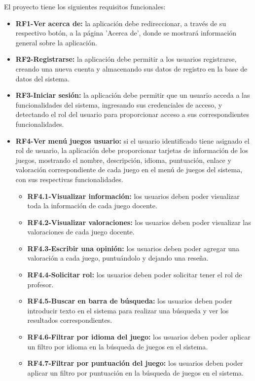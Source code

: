 El proyecto tiene los siguientes requisitos funcionales:
\begin{itemize}
\tightlist
    \item \textbf{RF1-Ver acerca de:} la aplicación debe redireccionar, a través de su respectivo botón, a la página 'Acerca de', donde se mostrará información general sobre la aplicación.
    \item \textbf{RF2-Registrarse:} la aplicación debe permitir a los usuarios registrarse, creando una nueva cuenta y almacenando sus datos de registro en la base de datos del sistema.
    \item \textbf{RF3-Iniciar sesión:} la aplicación debe permitir que un usuario acceda a las funcionalidades del sistema, ingresando sus credenciales de acceso, y detectando el rol del usuario para proporcionar acceso a sus correspondientes funcionalidades.
    \item \textbf{RF4-Ver menú juegos usuario:} si el usuario identificado tiene asignado el rol de usuario, la aplicación debe proporcionar tarjetas de información de los juegos, mostrando el nombre, descripción, idioma, puntuación, enlace y valoración correspondiente de cada juego en el menú de juegos del sistema, con sus respectivas funcionalidades.
        \begin{itemize}
        \tightlist
            \item \textbf{RF4.1-Visualizar información:} los usuarios deben poder visualizar toda la información de cada juego docente.
            \item \textbf{RF4.2-Visualizar valoraciones:} los usuarios deben poder visualizar las valoraciones de cada juego docente.
            \item \textbf{RF4.3-Escribir una opinión:} los usuarios deben poder agregar una valoración a cada juego, puntuándolo y dejando una reseña.
            \item \textbf{RF4.4-Solicitar rol:} los usuarios deben poder solicitar tener el rol de profesor.
            \item \textbf{RF4.5-Buscar en barra de búsqueda:} los usuarios deben poder introducir texto en el sistema para realizar una búsqueda y ver los resultados correspondientes.
            \item \textbf{RF4.6-Filtrar por idioma del juego:} los usuarios deben poder aplicar un filtro por idioma en la búsqueda de juegos en el sistema.
            \item\textbf{RF4.7-Filtrar por puntuación del juego:} los usuarios deben poder aplicar un filtro por puntuación en la búsqueda de juegos en el sistema.

\end{itemize}
\end{itemize}

